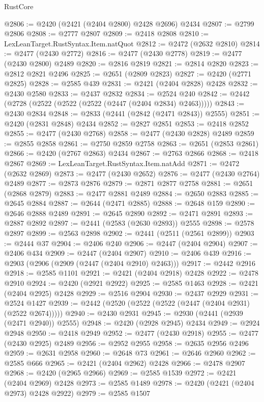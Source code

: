 \begin{lexlean}{RustCore}
\begin{coremodule}
@2806 := @2420 (@2421 (@2404 @2800) @2428 @2696) @2434
@2807 := @2799 @2806
@2808 := @2777 @2807
@2809 := @2418 @2808
@2810 := LexLeanTarget.RustSyntax.Item.natQuot
@2812 := @2472 (@2632 @2810)
@2814 := @2477 (@2430 @2772)
@2816 := @2477 (@2430 @2778)
@2819 := @2477 (@2430 @2800) @2489
@2820 := @2816 @2819
@2821 := @2814 @2820
@2823 := @2812 @2821 @2496
@2825 := @2651 (@2809 @2823)
@2827 := @2420 (@2771 @2825)
@2828 := @2585 @439
@2831 := @2421 (@2404 @2828) @2428
@2832 := @2430 @2580
@2833 := @2437 @2832
@2834 := @2524 @240
@2842 := @2442 (@2728 (@2522 (@2522 (@2522 (@2447 (@2404 @2834) @2463)))))
@2843 := @2430 @2834
@2848 := @2833 (@2441 (@2842 (@2471 @2843)) @2555)
@2851 := @2420 (@2831 @2848) @2434
@2852 := @2827 @2851
@2853 := @2418 @2852
@2855 := @2477 (@2430 @2768)
@2858 := @2477 (@2430 @2828) @2489
@2859 := @2855 @2858
@2861 := @2750 @2859 @2758
@2863 := @2651 (@2853 @2861)
@2866 := @2420 (@2767 @2863) @2434
@2867 := @2763 @2866
@2868 := @2418 @2867
@2869 := LexLeanTarget.RustSyntax.Item.natAdd
@2871 := @2472 (@2632 @2869)
@2873 := @2477 (@2430 @2652)
@2876 := @2477 (@2430 @2764) @2489
@2877 := @2873 @2876
@2879 := @2871 @2877 @2758
@2881 := @2651 (@2868 @2879)
@2883 := @2477 @2881 @2489
@2884 := @2650 @2883
@2885 := @2645 @2884
@2887 := @2644 (@2471 @2885)
@2888 := @2648 @159
@2890 := @2646 @2888 @2489
@2891 := @2645 @2890
@2892 := @2471 @2891
@2893 := @2887 @2892
@2897 := @2441 (@2583 (@2630 @2893)) @2555
@2898 := @2578 @2897
@2899 := @2563 @2898
@2902 := @2441 (@2511 (@2561 @2899))
@2903 := @2444 @37
@2904 := @2406 @240
@2906 := @2447 (@2404 @2904)
@2907 := @2406 @434
@2909 := @2447 (@2404 @2907)
@2910 := @2406 @439
@2916 := @2903 (@2906 (@2909 (@2447 (@2404 @2910) @2463)))
@2917 := @2442 @2916
@2918 := @2585 @1101
@2921 := @2421 (@2404 @2918) @2428
@2922 := @2478 @2910
@2924 := @2420 (@2921 @2922)
@2925 := @2585 @1463
@2928 := @2421 (@2404 @2925) @2428
@2929 := @2516 @2904
@2930 := @2437 @2929
@2931 := @2524 @1427
@2939 := @2442 (@2520 (@2522 (@2522 (@2447 (@2404 @2931) (@2522 @2674)))))
@2940 := @2430 @2931
@2945 := @2930 (@2441 (@2939 (@2471 @2940)) @2555)
@2948 := @2420 (@2928 @2945) @2434
@2949 := @2924 @2948
@2950 := @2418 @2949
@2952 := @2477 (@2430 @2918)
@2955 := @2477 (@2430 @2925) @2489
@2956 := @2952 @2955
@2958 := @2635 @2956 @2496
@2959 := @2631 @2958
@2960 := @2648 @73
@2961 := @2646 @2960
@2962 := @2585 @666
@2965 := @2421 (@2404 @2962) @2428
@2966 := @2478 @2907
@2968 := @2420 (@2965 @2966)
@2969 := @2585 @1539
@2972 := @2421 (@2404 @2969) @2428
@2973 := @2585 @1489
@2978 := @2420 (@2421 (@2404 @2973) @2428 @2922)
@2979 := @2585 @1507

\end{coremodule}
\end{lexlean}
